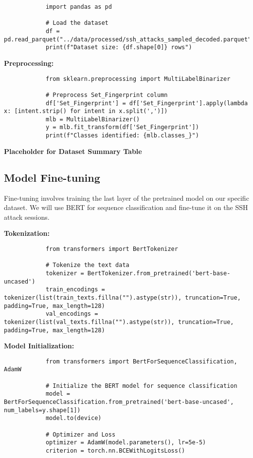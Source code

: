         \begin{verbatim}
            import pandas as pd

            # Load the dataset
            df = pd.read_parquet("../data/processed/ssh_attacks_sampled_decoded.parquet")
            print(f"Dataset size: {df.shape[0]} rows")
        \end{verbatim}

        \textbf{Preprocessing:}

        \begin{verbatim}
            from sklearn.preprocessing import MultiLabelBinarizer

            # Preprocess Set_Fingerprint column
            df['Set_Fingerprint'] = df['Set_Fingerprint'].apply(lambda x: [intent.strip() for intent in x.split(',')])
            mlb = MultiLabelBinarizer()
            y = mlb.fit_transform(df['Set_Fingerprint'])
            print(f"Classes identified: {mlb.classes_}")
        \end{verbatim}

        \textbf{Placeholder for Dataset Summary Table}
        
    \subsection{Model Fine-tuning}
    
        Fine-tuning involves training the last layer of the pretrained model on our specific dataset. We will use BERT for sequence classification and fine-tune it on the SSH attack sessions.

        \textbf{Tokenization:}

        \begin{verbatim}
            from transformers import BertTokenizer

            # Tokenize the text data
            tokenizer = BertTokenizer.from_pretrained('bert-base-uncased')
            train_encodings = tokenizer(list(train_texts.fillna("").astype(str)), truncation=True, padding=True, max_length=128)
            val_encodings = tokenizer(list(val_texts.fillna("").astype(str)), truncation=True, padding=True, max_length=128)
        \end{verbatim}

        \textbf{Model Initialization:}

        \begin{verbatim}
            from transformers import BertForSequenceClassification, AdamW

            # Initialize the BERT model for sequence classification
            model = BertForSequenceClassification.from_pretrained('bert-base-uncased', num_labels=y.shape[1])
            model.to(device)

            # Optimizer and Loss
            optimizer = AdamW(model.parameters(), lr=5e-5)
            criterion = torch.nn.BCEWithLogitsLoss()
        \end{verbatim}

